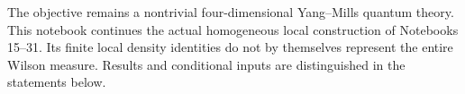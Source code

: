 \documentclass[11pt]{article}
\theoremstyle{remark}
\begin{document}
The objective remains a nontrivial four-dimensional Yang--Mills
quantum theory. This notebook continues the actual homogeneous
local construction of Notebooks 15--31. Its finite local density
identities do not by themselves represent the entire Wilson
measure. Results and conditional inputs are distinguished in
the statements below.
\end{document}
